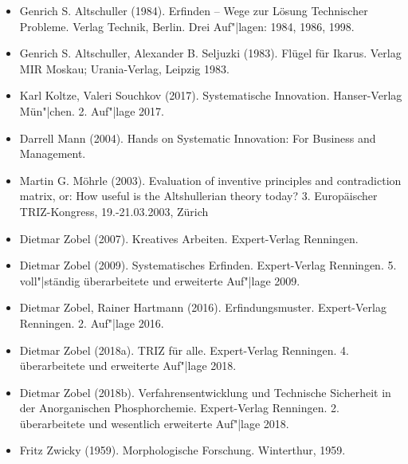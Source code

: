 \documentclass[12pt,a4paper]{article}
\begin{document}
\begin{itemize}
\item Genrich S. Altschuller (1984). Erfinden – Wege zur Lösung Technischer
  Probleme. Verlag Technik, Berlin. Drei Auf"|lagen: 1984, 1986, 1998.
\item Genrich S. Altschuller, Alexander B. Seljuzki (1983). Flügel für
  Ikarus. Verlag MIR Moskau; Urania-Verlag, Leipzig 1983.
\item Karl Koltze, Valeri Souchkov (2017). Systematische Innovation.
  Hanser-Verlag Mün"|chen. 2. Auf"|lage 2017.
\item Darrell Mann (2004).  Hands on Systematic Innovation: For Business and
  Management. 
\item Martin G. Möhrle (2003).  Evaluation of inventive principles and
  contradiction matrix, or: How useful is the Altshullerian theory
  today? 3. Europäischer TRIZ-Kongress, 19.-21.03.2003, Zürich
\item Dietmar Zobel (2007). Kreatives Arbeiten. Expert-Verlag Renningen.
\item Dietmar Zobel (2009). Systematisches Erfinden. Expert-Verlag Renningen.
  5. voll"|ständig überarbeitete und erweiterte Auf"|lage 2009.
\item Dietmar Zobel, Rainer Hartmann (2016). Erfindungsmuster. Expert-Verlag
  Renningen. 2. Auf"|lage 2016.
\item Dietmar Zobel (2018a). TRIZ für alle. Expert-Verlag Renningen.
  4. überarbeitete und erweiterte Auf"|lage 2018.
\item Dietmar Zobel (2018b). Verfahrensentwicklung und Technische Sicherheit
  in der Anorganischen Phosphorchemie. Expert-Verlag Renningen.
  2. überarbeitete und wesentlich erweiterte Auf"|lage 2018.
\item Fritz Zwicky (1959). Morphologische Forschung. Winterthur, 1959.
\end{itemize}

\end{document}
